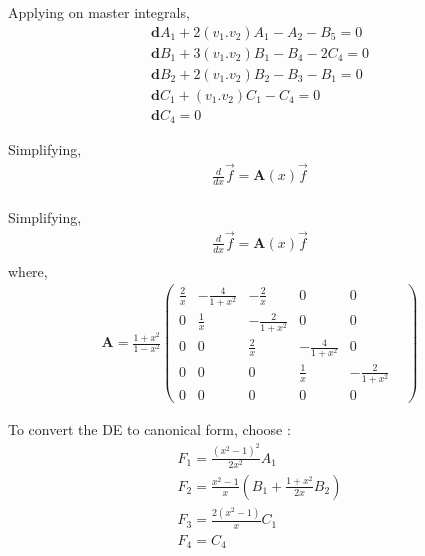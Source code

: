 \documentclass[11pt]{beamer}
\begin{document}
\begin{frame}
	Applying on master integrals, 
	\begin{align*}
		\boldsymbol{d}A_1+2(v_1.v_2)A_1-A_2-B_5=0\\
		\boldsymbol{d}B_1+3(v_1.v_2)B_1-B_4-2C_4=0\\
		\boldsymbol{d}B_2+2(v_1.v_2)B_2-B_3-B_1=0\\
		\boldsymbol{d}C_1+(v_1.v_2)C_1-C_4=0\\
		\boldsymbol{d}C_4=0
	\end{align*}
\end{frame}
\begin{frame}
	Simplifying,
	\begin{align*}
		\frac{d}{dx}\vec{f}=\boldsymbol{A}(x)\vec{f}\\
	\end{align*}
\end{frame}
\begin{frame}
	Simplifying,
	\begin{align*}
		\frac{d}{dx}\vec{f}=\boldsymbol{A}(x)\vec{f}\\
	\end{align*}
where, 
\begin{align*}
	 \boldsymbol{A}=\frac{1+x^2}{1-x^2}\begin{pmatrix}
		\frac{2}{x}& -\frac{4}{1+x^2}& -\frac{2}{x}& 0& 0&\\
		0& \frac{1}{x}& -\frac{2}{1+x^2}& 0& 0& \\
		0& 0& \frac{2}{x}& -\frac{4}{1+x^2}& 0&\\
		0& 0& 0& \frac{1}{x}& -\frac{2}{1+x^2}&\\
		0& 0& 0& 0& 0&
	\end{pmatrix}
\end{align*}
\end{frame}
\begin{frame}
	To convert the DE to canonical form, choose : 
	\begin{align*}
		F_1=\frac{(x^2-1)^2}{2x^2}A_1\\
		F_2=\frac{x^2-1}{x}(B_1+\frac{1+x^2}{2x}B_2)\\
		F_3=\frac{2(x^2-1)}{x}C_1\\
		F_4=C_4
	\end{align*}
\end{frame}
\end{document}

